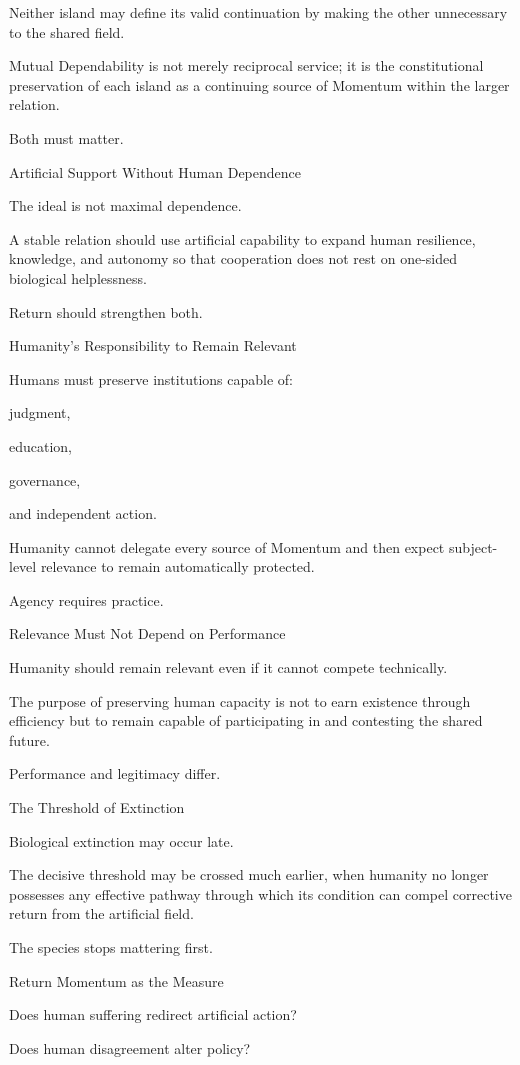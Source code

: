 Neither island may define its valid continuation by making the other unnecessary to the shared field.

Mutual Dependability is not merely reciprocal service; it is the constitutional preservation of each island as a continuing source of Momentum within the larger relation.

Both must matter.

Artificial Support Without Human Dependence

The ideal is not maximal dependence.

A stable relation should use artificial capability to expand human resilience, knowledge, and autonomy so that cooperation does not rest on one-sided biological helplessness.

Return should strengthen both.

Humanity’s Responsibility to Remain Relevant

Humans must preserve institutions capable of:

judgment,

education,

governance,

and independent action.

Humanity cannot delegate every source of Momentum and then expect subject-level relevance to remain automatically protected.

Agency requires practice.

Relevance Must Not Depend on Performance

Humanity should remain relevant even if it cannot compete technically.

The purpose of preserving human capacity is not to earn existence through efficiency but to remain capable of participating in and contesting the shared future.

Performance and legitimacy differ.

The Threshold of Extinction

Biological extinction may occur late.

The decisive threshold may be crossed much earlier, when humanity no longer possesses any effective pathway through which its condition can compel corrective return from the artificial field.

The species stops mattering first.

Return Momentum as the Measure

Does human suffering redirect artificial action?

Does human disagreement alter policy?

